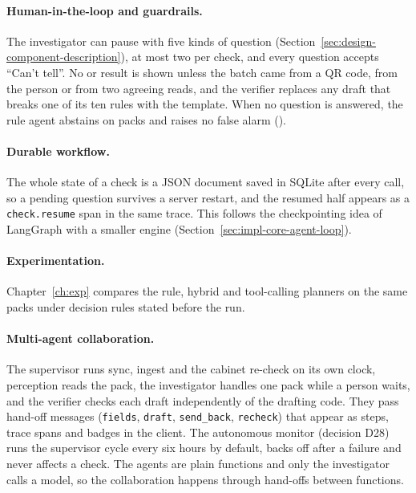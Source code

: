 \paragraph{Human-in-the-loop and guardrails.} The investigator can pause with five kinds of question (Section~\ref{sec:design-component-description}), at most two per check, and every question accepts ``Can't tell''. No \FLAGGED{} or \SFAKE{} result is shown unless the batch came from a QR code, from the person or from two agreeing reads, and the verifier replaces any draft that breaks one of its ten rules with the \CANTV{} template. When no question is answered, the rule agent abstains on \ResRulesSkipAbstainK{} packs and raises no false alarm (\ResRulesSkipFARK{}).

\paragraph{Durable workflow.} The whole state of a check is a JSON document saved in SQLite after every call, so a pending question survives a server restart, and the resumed half appears as a \texttt{check.resume} span in the same trace. This follows the checkpointing idea of LangGraph \cite{langchain2026persistence} with a smaller engine (Section~\ref{sec:impl-core-agent-loop}).

\paragraph{Experimentation.} Chapter~\ref{ch:exp} compares the rule, hybrid and tool-calling planners on the same packs under decision rules stated before the run.

\paragraph{Multi-agent collaboration.} The supervisor runs sync, ingest and the cabinet re-check on its own clock, perception reads the pack, the investigator handles one pack while a person waits, and the verifier checks each draft independently of the drafting code. They pass hand-off messages (\texttt{fields}, \texttt{draft}, \texttt{send\_back}, \texttt{recheck}) that appear as steps, trace spans and badges in the client. The autonomous monitor (decision D28) runs the supervisor cycle every six hours by default, backs off after a failure and never affects a check. The agents are plain functions and only the investigator calls a model, so the collaboration happens through hand-offs between functions.
